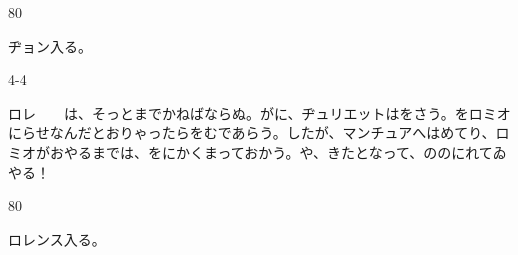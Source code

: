 \documentclass[tate,paper=b6j,jafontsize=9pt]{jlreq}
\begin{document}
\begin{azconvIndented}{8\zw}{0\zw}

ヂョン入る。

\end{azconvIndented}
\begin{azconvIndented}{4\zw}{-4\zw}

ロレ　　は、そっとまでかねばならぬ。がに、ヂュリエットはをさう。をロミオにらせなんだとおりゃったらをむであらう。したが、マンチュアへはめてり、ロミオがおやるまでは、をにかくまっておかう。や、きたとなって、ののにれてゐやる！

\end{azconvIndented}
\begin{azconvIndented}{8\zw}{0\zw}

ロレンス入る。

\end{azconvIndented}

\end{document}
